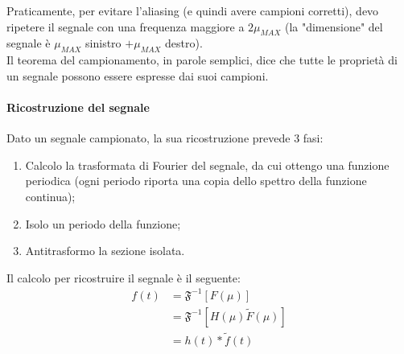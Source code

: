 \documentclass[a4paper, 10pt]{report}
\begin{document}
\noindent Praticamente, per evitare l'aliasing (e quindi avere campioni corretti), devo ripetere il segnale con una frequenza maggiore a $2\mu_{MAX}$ (la "dimensione" del segnale è $\mu_{MAX}$ sinistro $+ \mu_{MAX}$ destro).\\

\noindent Il teorema del campionamento, in parole semplici, dice che tutte le proprietà di un segnale possono essere espresse dai suoi campioni.

\paragraph*{Ricostruzione del segnale} Dato un segnale campionato, la sua ricostruzione prevede 3 fasi:
\begin{enumerate}
\item Calcolo la trasformata di Fourier del segnale, da cui ottengo una funzione periodica (ogni periodo riporta una copia dello spettro della funzione continua);
\item Isolo un periodo della funzione;
\item Antitrasformo la sezione isolata.
\end{enumerate}



\noindent{}

\noindent Il calcolo per ricostruire il segnale è il seguente:
\begin{align*}
f(t) &= \mathfrak{F}^{-1}[F(\mu)]\\
&= \mathfrak{F}^{-1}[H(\mu)\tilde{F}(\mu)]\\
&= h(t) * \tilde{f}(t)
\end{align*}
\end{document}
